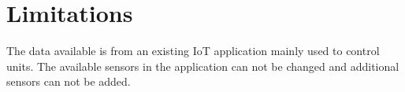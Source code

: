 \section{Limitations}
\label{sec:delimitations}
The data available is from an existing IoT application mainly used to control units.
The available sensors in the application can not be changed and additional sensors can not be added.

